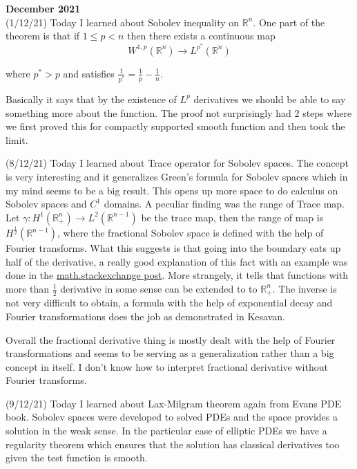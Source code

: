 \documentclass[12pt,a4paper]{article}
\newcommand{\R}{\mathbb{R}}
\begin{document}
   \maketitle\textbf{December 2021}
   \\
   
   (1/12/21) Today I learned about Sobolev inequality on $\R^n$. One part of the theorem is that if $1 \le p < n$ then there exists a continuous map 
   \[ W^{1,p}(\R^n) \to L^{p^*}(\R^n) \]
   
   where $p^* > p$ and satisfies $\frac{1}{p^*} = \frac{1}{p} - \frac{1}{n}$.
   
   Basically it says that by the existence of $L^p$ derivatives we should be able to say something more about the function. The proof not surprisingly had 2 steps where we first proved this for compactly supported smooth function and then took the limit.
   
   (8/12/21) Today I learned about Trace operator for Sobolev spaces. The concept is very interesting and it generalizes Green's formula for Sobolev spaces which in my mind seems to be a big result. This opens up more space to do calculus on Sobolev spaces and $C^1$ domains. A peculiar finding was the range of Trace map. Let $\gamma : H^1(\R^n_+) \to L^2(\R^{n-1})$ be the trace map, then the range of map is $H^{\frac{1}{2}}(\R^{n-1})$, where the fractional Sobolev space is defined with the help of Fourier transforms. What this suggests is that going into the boundary eats up half of the derivative, a really good explanation of this fact with an example was done in the \href{https://math.stackexchange.com/a/3627476/445705}{math.stackexchange post}. More strangely, it tells that functions with more than $\frac{1}{2}$ derivative in some sense can be extended to to $\R^n_+$. The inverse is not very difficult to obtain, a formula with the help of exponential decay and Fourier transformations does the job as demonstrated in Kesavan. 
   
   Overall the fractional derivative thing is mostly dealt with the help of Fourier transformations and seems to be serving as a generalization rather than a big concept in itself. I don't know how to interpret fractional derivative without Fourier transforms. 
   
   (9/12/21) Today I learned about Lax-Milgram theorem again from Evans PDE book. Sobolev spaces were developed to solved PDEs and the space provides a solution in the weak sense. In the particular case of elliptic PDEs we have a regularity theorem which ensures that the solution has classical derivatives too given the test function is smooth. 
   
\end{document}
